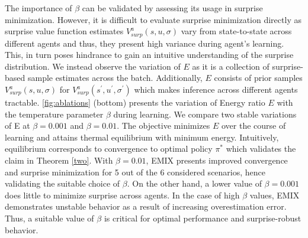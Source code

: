 \documentclass{article}
\begin{document}
\begin{multicols}{2}
The importance of $\beta$ can be validated by assessing its usage in surprise minimization. However, it is difficult to evaluate surprise minimization directly as surprise value function estimates $V_{surp}^{a}(s,u,\sigma)$ vary from state-to-state across different agents and thus, they present high variance during agent's learning. This, in turn poses hindrance to gain an intuitive understanding of the surprise distribution. We instead observe the variation of $E$ as it is a collection of surprise-based sample estimates across the batch. Additionally, $E$ consists of prior samples $V_{surp}^{a}(s,u,\sigma)$ for $V_{surp}^{a}(s^{'},u^{'},\sigma^{'})$ which makes inference across different agents tractable. \autoref{fig:ablations} (bottom) presents the variation of Energy ratio $E$ with the temperature parameter $\beta$ during learning. We compare two stable variations of E at $\beta=0.001$ and $\beta=0.01$. The objective minimizes $E$ over the course of learning and attains thermal equilibrium with minimum energy. Intuitively, equilibrium corresponds to convergence to optimal policy $\pi^{*}$ which validates the claim in Theorem \autoref{two}. With $\beta=0.01$, EMIX presents improved convergence and surprise minimization for 5 out of the 6 considered scenarios, hence validating the suitable choice of $\beta$. On the other hand, a lower value of $\beta=0.001$ does little to minimize surprise across agents. In the case of high $\beta$ values, EMIX demonstrates unstable behavior as a result of increasing overestimation error. Thus, a suitable value of $\beta$ is critical for optimal performance and surprise-robust behavior. 


\end{multicols}
\end{document}
